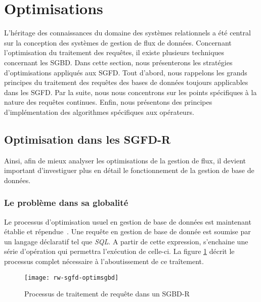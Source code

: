 \section{Optimisations}\label{sec:rw:sgfd:optim}
L'héritage des connaissances du domaine des systèmes relationnels a été central sur la conception des systèmes de gestion de flux de données. Concernant l'optimisation du traitement des requêtes, il existe plusieurs techniques concernant les SGBD. Dans cette section, nous présenterons les stratégies d'optimisations appliqués aux SGFD. Tout d'abord, nous rappelons les grands principes du traitement des requêtes des bases de données toujours applicables dans les SGFD. Par la suite, nous nous concentrons sur les points spécifiques à la nature des requêtes continues. Enfin, nous présentons des principes d'implémentation des algorithmes spécifiques aux opérateurs.

\subsection{Optimisation dans les SGFD-R}
Ainsi, afin de mieux analyser les optimisations de la gestion de flux, il devient important d'investiguer plus en détail le fonctionnement de la gestion de base de données.

\subsubsection{Le problème dans sa globalité}
Le processus d'optimisation usuel en gestion de base de données est maintenant établie et répendue~\cite{Ioannidis:optimization}. Une requête en gestion de base de donnée est soumise par un langage déclaratif tel que \textit{SQL}. A partir de cette expression, s'enchaine une série d'opération qui permettra l'exécution de celle-ci. La figure \ref{fig:rw:sgfd:optim:processus} décrit le processus complet nécessaire à l'aboutissement de ce traîtement. 
\begin{figure}[h]
\centering
\texttt{[image: rw-sgfd-optimsgbd]}
\caption{Processus de traitement de requête dans un SGBD-R}\label{fig:rw:sgfd:optim:processus}
\end{figure}

